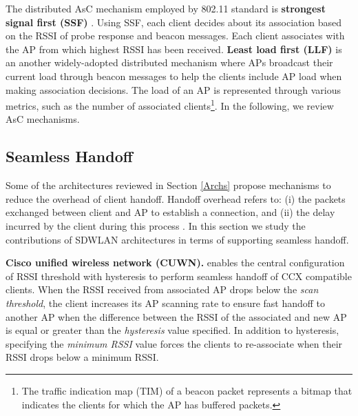 




The distributed AsC mechanism employed by 802.11 standard is \textbf{strongest signal first (SSF)} \cite{SSF,802.11}. 
Using SSF, each client decides about its association based on the RSSI of probe response and beacon messages.
Each client associates with the AP from which highest RSSI has been received.
\textbf{Least load first (LLF)} \cite{LLF} is an another widely-adopted distributed mechanism where APs broadcast their current load through beacon messages to help the clients include AP load when making association decisions.
The load of an AP is represented through various metrics, such as the number of associated clients\footnote{The traffic indication map (TIM) of a beacon packet represents a bitmap that indicates the clients for which the AP has buffered packets.}.
In the following, we review AsC mechanisms.


\subsection{Seamless Handoff}
\label{seam-handoff}
Some of the architectures reviewed in Section \ref{Archs} propose mechanisms to reduce the overhead of client handoff.
Handoff overhead refers to: (i) the packets exchanged between client and AP to establish a connection, and (ii) the delay incurred by the client during this process \cite{pack2007fast}.
In this section we study the contributions of SDWLAN architectures in terms of supporting seamless handoff.


\textbf{Cisco unified wireless network (CUWN).}%
\label{CUWN_AM}
\cite{Cisco} enables the central configuration of RSSI threshold with hysteresis to perform seamless handoff of CCX \cite{CiscoCCX} compatible clients.
When the RSSI received from associated AP drops below the \textit{scan threshold}, the client increases its AP scanning rate to ensure fast handoff to another AP when the difference between the RSSI of the associated and new AP is equal or greater than the \textit{hysteresis} value specified.
In addition to hysteresis, specifying the \textit{minimum RSSI} value forces the clients to re-associate when their RSSI drops below a minimum RSSI. 

